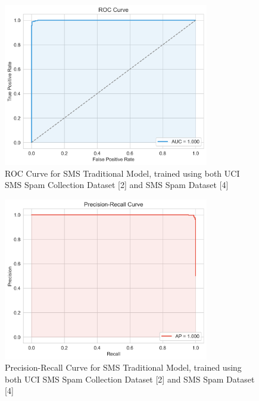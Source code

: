 \documentclass{article}
\begin{document}

\begin{figure}[htbp]
    \centering
    \includegraphics[width=0.8\textwidth]{../analysis/sms/traditional/roc_curve.png}
    \caption{ROC Curve for SMS Traditional Model, trained using both UCI SMS Spam Collection Dataset [2] and SMS Spam Dataset [4]}
    \label{fig:roc_curve_6}
\end{figure}

\begin{figure}[htbp]
    \centering
    \includegraphics[width=0.8\textwidth]{../analysis/sms/traditional/precision_recall_curve.png}
    \caption{Precision-Recall Curve for SMS Traditional Model, trained using both UCI SMS Spam Collection Dataset [2] and SMS Spam Dataset [4]}
    \label{fig:precision_recall_curve_6}
\end{figure}
\end{document}
